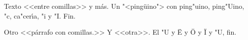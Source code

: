 \documentclass{article}
\begin{document}
Texto <<entre comillas>> y m\'as. Un "<ping\"uino"> con ping"uino, ping"Uino, "c, ca"cer\'{\i}a, "i y "I. Fin.

Otro <<p\'arrafo con comillas.>> Y <<otra>>. El "U y \"E y \"O y \"I y "U, fin.
\end{document}
